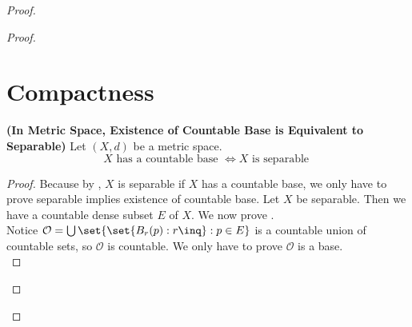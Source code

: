 \documentclass{report}
\begin{document}
\begin{proof}
\begin{proof}
\section{Compactness}
\begin{theorem}
\label{3.6.1}
\textbf{(In Metric Space, Existence of Countable Base is Equivalent to Separable)} Let $(X,d)$ be a metric space. 
\begin{equation}
X\text{ has a countable base }\iff  X\text{ is separable }
\end{equation}
\end{theorem}
\begin{proof}
Because by , $X$ is separable if  $X$ has a countable base, we only have to prove separable implies existence of countable base. Let $X$ be separable. Then we have a countable dense subset $E$ of $X$. We now prove
.\\

Notice $\mathcal{O}=\bigcup \set{\set{B_r(p):r\inq}:p\in E}$ is a countable union of countable sets, so $\mathcal{O}$ is countable. We only have to prove $\mathcal{O}$ is a base.\\


\end{proof}
\end{proof}
\end{proof}
\end{document}
